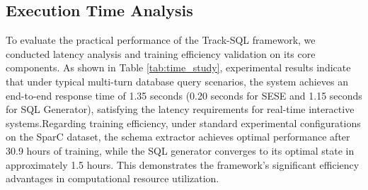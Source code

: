 \documentclass[11pt]{article}
\begin{document}
\subsection{Execution Time Analysis}
To evaluate the practical performance of the Track-SQL framework, we conducted latency analysis and training efficiency validation on its core components. As shown in Table \ref{tab:time_study}, experimental results indicate that under typical multi-turn database query scenarios, the system achieves an end-to-end response time of 1.35 seconds (0.20 seconds for SESE and 1.15 seconds for SQL Generator), satisfying the latency requirements for real-time interactive systems.Regarding training efficiency, under standard experimental configurations on the SparC dataset, the schema extractor achieves optimal performance after 30.9 hours of training, while the SQL generator converges to its optimal state in approximately 1.5 hours. This demonstrates the framework's significant efficiency advantages in computational resource utilization.

\begin{table}
    \centering
    \large
    \renewcommand\arraystretch{1.3}
    \caption{Time performance of the Track-SQL framework, \textbf{Train} employs the number of hours required to achieve the optimal model as the performance metric, while \textbf{Inference} bases its evaluation on the time consumed to perform inference on a single batch.}
    \label{tab:time_study}
\end{table}
\end{document}
